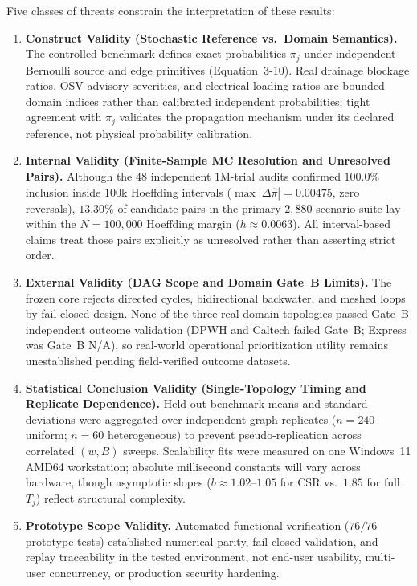 Five classes of threats constrain the interpretation of these results:
\begin{enumerate}[label=\arabic*.,leftmargin=*]
\item \textbf{Construct Validity (Stochastic Reference vs.\ Domain
Semantics).} The controlled benchmark defines exact probabilities $\pi_j$
under independent Bernoulli source and edge primitives (Equation~3-10).
Real drainage blockage ratios, OSV advisory severities, and electrical
loading ratios are bounded domain indices rather than calibrated
independent probabilities; tight agreement with $\pi_j$ validates the
propagation mechanism under its declared reference, not physical
probability calibration.
\item \textbf{Internal Validity (Finite-Sample MC Resolution and
Unresolved Pairs).} Although the $48$ independent $1\text{M}$-trial
audits confirmed $100.0\%$ inclusion inside $100\text{k}$ Hoeffding
intervals ($\max|\Delta\hat{\pi}|=0.00475$, zero reversals), $13.30\%$
of candidate pairs in the primary $2,880$-scenario suite lay within the
$N=100{,}000$ Hoeffding margin ($h \approx 0.0063$). All interval-based
claims treat those pairs explicitly as unresolved rather than asserting
strict order.
\item \textbf{External Validity (DAG Scope and Domain Gate~B Limits).}
The frozen core rejects directed cycles, bidirectional backwater, and
meshed loops by fail-closed design. None of the three real-domain
topologies passed Gate~B independent outcome validation (DPWH and
Caltech failed Gate~B; Express was Gate~B N/A), so real-world
operational prioritization utility remains unestablished pending
field-verified outcome datasets.
\item \textbf{Statistical Conclusion Validity (Single-Topology Timing
and Replicate Dependence).} Held-out benchmark means and standard
deviations were aggregated over independent graph replicates ($n=240$
uniform; $n=60$ heterogeneous) to prevent pseudo-replication across
correlated $(w, B)$ sweeps. Scalability fits were measured on one
Windows~11 AMD64 workstation; absolute millisecond constants will vary
across hardware, though asymptotic slopes ($b \approx 1.02$--$1.05$ for
CSR vs.\ $1.85$ for full $T_j$) reflect structural complexity.
\item \textbf{Prototype Scope Validity.} Automated functional
verification ($76/76$ prototype tests) established numerical parity,
fail-closed validation, and replay traceability in the tested
environment, not end-user usability, multi-user concurrency, or
production security hardening.
\end{enumerate}
